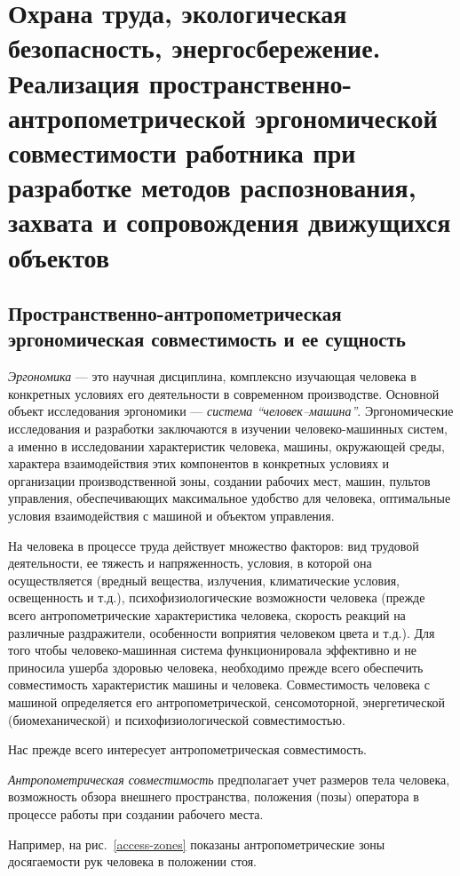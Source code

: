 \section{Охрана труда, экологическая безопасность, энергосбережение. Реализация пространственно-антропометрической эргономической совместимости работника при разработке методов распознования, захвата и сопровождения движущихся объектов}

\subsection{Пространственно-антропометрическая эргономическая совместимость и ее сущность}
\emph{Эргономика} --- это научная дисциплина, комплексно изучающая человека в конкретных условиях его деятельности в современном производстве. Основной объект исследования эргономики --- \emph{система ``человек--машина''}. Эргономические исследования и разработки заключаются в изучении человеко-машинных систем, а именно в исследовании характеристик человека, машины, окружающей среды, характера взаимодействия этих компонентов в конкретных условиях и организации производственной зоны, создании рабочих мест, машин, пультов управления, обеспечивающих максимальное удобство для человека, оптимальные условия взаимодействия с машиной и объектом управления.\cite{devisilov09}

На человека в процессе труда действует множество факторов: вид трудовой деятельности, ее тяжесть и напряженность, условия, в которой она осуществляется (вредный вещества, излучения, климатические условия, освещенность и т.д.), психофизиологические возможности человека (прежде всего антропометрические характеристика человека, скорость реакций на различные раздражители, особенности воприятия человеком цвета и т.д.). Для того чтобы человеко-машинная система функционировала эффективно и не приносила ушерба здоровью человека, необходимо прежде всего обеспечить совместимость характеристик машины и человека. Совместимость человека с машиной определяется его антропометрической, сенсомоторной, энергетической (биомеханической) и психофизиологической совместимостью.\cite{devisilov09}

Нас прежде всего интересует антропометрическая совместимость.

\emph{Антропометрическая совместимость} предполагает учет размеров тела человека, возможность обзора внешнего пространства, положения (позы) оператора в процессе работы при создании рабочего места.\cite{devisilov09}

Например, на рис.~\ref{access-zones} показаны антропометрические зоны досягаемости рук человека в положении стоя.

